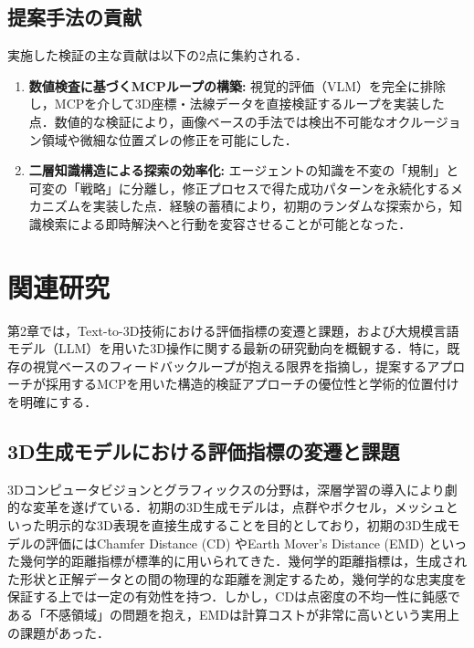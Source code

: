 \documentclass[dvipdfmx, a4paper, 9pt]{deimj}
\begin{document}
\subsection{提案手法の貢献}

実施した検証の主な貢献は以下の2点に集約される．
\begin{enumerate}
    \item \textbf{数値検査に基づくMCPループの構築:} 
    視覚的評価（VLM）を完全に排除し，MCPを介して3D座標・法線データを直接検証するループを実装した点．数値的な検証により，画像ベースの手法では検出不可能なオクルージョン領域や微細な位置ズレの修正を可能にした．
    \item \textbf{二層知識構造による探索の効率化:} 
    エージェントの知識を不変の「規制」と可変の「戦略」に分離し，修正プロセスで得た成功パターンを永続化するメカニズムを実装した点．経験の蓄積により，初期のランダムな探索から，知識検索による即時解決へと行動を変容させることが可能となった．
\end{enumerate}

\section{関連研究}

第2章では，Text-to-3D技術における評価指標の変遷と課題，および大規模言語モデル（LLM）を用いた3D操作に関する最新の研究動向を概観する．特に，既存の視覚ベースのフィードバックループが抱える限界を指摘し，提案するアプローチが採用するMCPを用いた構造的検証アプローチの優位性と学術的位置付けを明確にする．

\subsection{3D生成モデルにおける評価指標の変遷と課題}

3Dコンピュータビジョンとグラフィックスの分野は，深層学習の導入により劇的な変革を遂げている．初期の3D生成モデルは，点群やボクセル，メッシュといった明示的な3D表現を直接生成することを目的としており，初期の3D生成モデルの評価にはChamfer Distance (CD) やEarth Mover's Distance (EMD) といった幾何学的距離指標が標準的に用いられてきた\cite{fan2017point,nichol2022point}．幾何学的距離指標は，生成された形状と正解データとの間の物理的な距離を測定するため，幾何学的な忠実度を保証する上では一定の有効性を持つ．しかし，CDは点密度の不均一性に鈍感である「不感領域」の問題を抱え，EMDは計算コストが非常に高いという実用上の課題があった．
\end{document}
